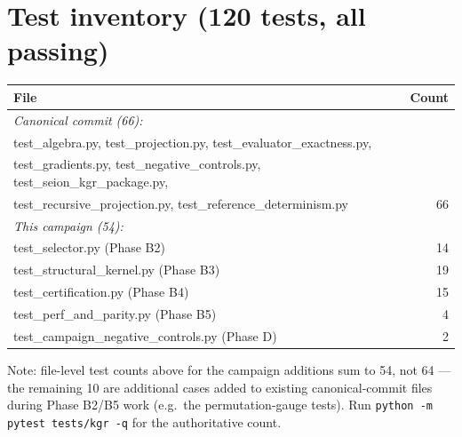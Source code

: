 \documentclass[11pt]{article}
\begin{document}
\section{Test inventory (120 tests, all passing)}
\begin{center}
\begin{tabular}{lr}
\toprule
File & Count \\
\midrule
\multicolumn{2}{l}{\textit{Canonical commit (66):}} \\
test\_algebra.py, test\_projection.py, test\_evaluator\_exactness.py, & \\
test\_gradients.py, test\_negative\_controls.py, test\_seion\_kgr\_package.py, & \\
test\_recursive\_projection.py, test\_reference\_determinism.py & 66 \\
\multicolumn{2}{l}{\textit{This campaign (54):}} \\
test\_selector.py (Phase B2) & 14 \\
test\_structural\_kernel.py (Phase B3) & 19 \\
test\_certification.py (Phase B4) & 15 \\
test\_perf\_and\_parity.py (Phase B5) & 4 \\
test\_campaign\_negative\_controls.py (Phase D) & 2 \\
\bottomrule
\end{tabular}
\end{center}
Note: file-level test counts above for the campaign additions sum to 54, not 64 --- the remaining
10 are additional cases added to existing canonical-commit files during Phase B2/B5 work
(e.g.\ the permutation-gauge tests). Run \texttt{python -m pytest tests/kgr -q} for the authoritative count.
\end{document}
